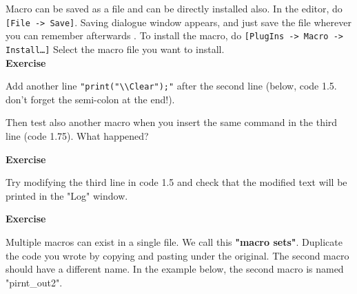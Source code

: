 \documentclass[11pt,a4paper,oneside]{report}
\newenvironment{indentexercise}[1]%
{{\setlength{\leftmargin}{2em}}%
\textbf{Exercise \thesubsection-#1}%
\begin{list}{}%
	\item%
}
{\end{list}}
\newcommand{\ijmenu}[1]{\texttt{\small#1}}
\begin{document}
Macro can be saved as a file and can be directly installed also. 
In the editor, do \ijmenu{[File -> Save]}. Saving dialogue window appears, 
and just save the file wherever you can remember afterwards . 
To install the macro, do \ijmenu{[PlugIns -> Macro -> Install\ldots]} 
Select the macro file you want to install.\\

\begin{indentexercise}{1}
\item Add another line \texttt{"print("\textbackslash{}\textbackslash{}Clear");"} 
after the second line (below, code 1.5. don't forget the semi-colon at the end!). 
\item 
Then test also another macro when you insert the same command in the third line (code 1.75). 
What happened?  
\item 
\end{indentexercise}

\begin{indentexercise}{2}
\item Try modifying the third line in code 1.5 
and check that the modified text will be printed in the "Log" window. \\
\end{indentexercise}

\begin{indentexercise}{3}
\item Multiple macros can exist in a single file. We call this \textbf{"macro sets"}. 
Duplicate the code you wrote by copying and pasting under the original. 
The second macro should have a different name. In the example below, the second macro is named "pirnt\_out2".
\end{indentexercise}
\end{document}
